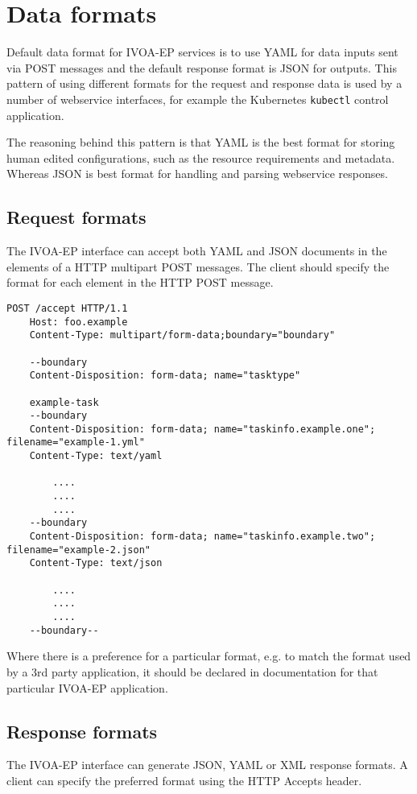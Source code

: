 \documentclass[11pt,a4paper]{ivoa}
\newcommand{\xml} {XML\xspace}
\newcommand{\json} {JSON\xspace}
\newcommand{\yaml} {YAML\xspace}
\newcommand{\webservice} {webservice\xspace}
\newcommand{\ivoep} {IVOA-EP\xspace}
\newcommand{\codeword}[1] {\texttt{#1}}
\begin{document}
\section{Data formats}
\label{sec:data-formats}
Default data format for \ivoep services is to use
\yaml for data inputs sent via POST messages and the default response format is \json for outputs.
This pattern of using different formats for the request and response data is used by a number of \webservice interfaces, for example the Kubernetes \codeword{kubectl} control application.

The reasoning behind this pattern is that \yaml is the best format for storing human edited configurations, such as the resource requirements and metadata. Whereas \json is best format for handling and parsing \webservice responses.

\subsection{Request formats}
\label{sec:request-formats}
The \ivoep interface can accept both YAML and JSON documents in the elements of a HTTP multipart POST messages. The client should specify the format for each element in the HTTP POST message.
\begin{lstlisting}[]
    POST /accept HTTP/1.1
    Host: foo.example
    Content-Type: multipart/form-data;boundary="boundary"

    --boundary
    Content-Disposition: form-data; name="tasktype"

    example-task
    --boundary
    Content-Disposition: form-data; name="taskinfo.example.one"; filename="example-1.yml"
    Content-Type: text/yaml

        ....
        ....
        ....
    --boundary
    Content-Disposition: form-data; name="taskinfo.example.two"; filename="example-2.json"
    Content-Type: text/json

        ....
        ....
        ....
    --boundary--
\end{lstlisting}

Where there is a preference for a particular format, e.g. to match the format used by a 3rd party application, it should be declared in documentation for that particular \ivoep application.

\subsection{Response formats}
\label{sec:response-formats}
The \ivoep interface can generate \json, \yaml or \xml response formats.
A client can specify the preferred format using the HTTP Accepts header.



\end{document}
